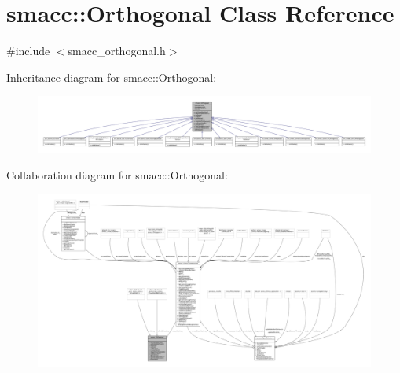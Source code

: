 \hypertarget{classsmacc_1_1Orthogonal}{}\section{smacc\+:\+:Orthogonal Class Reference}
\label{classsmacc_1_1Orthogonal}


{\ttfamily \#include $<$smacc\+\_\+orthogonal.\+h$>$}



Inheritance diagram for smacc\+:\+:Orthogonal\+:
\nopagebreak
\begin{figure}[H]
\begin{center}
\leavevmode
\includegraphics[width=350pt]{classsmacc_1_1Orthogonal__inherit__graph}
\end{center}
\end{figure}


Collaboration diagram for smacc\+:\+:Orthogonal\+:
\nopagebreak
\begin{figure}[H]
\begin{center}
\leavevmode
\includegraphics[width=350pt]{classsmacc_1_1Orthogonal__coll__graph}
\end{center}
\end{figure}

